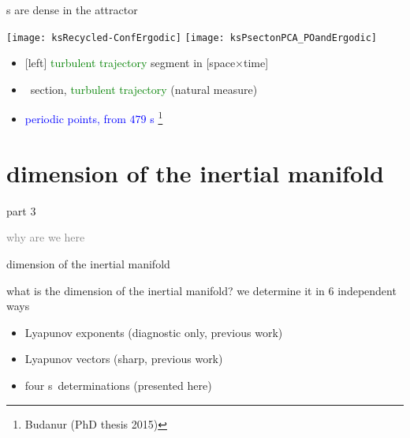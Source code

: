\begin{frame}{\po s are dense in the attractor}
\begin{center}
\texttt{[image: ksRecycled-ConfErgodic]}
\texttt{[image: ksPsectonPCA\_POandErgodic]}
\end{center}
\begin{itemize}
  \item {[left]} \textcolor{green}{turbulent trajectory} segment in [space$\times$time]
  \item \Poincare\ section, \textcolor{green}{turbulent trajectory} (natural measure)
  \item \textcolor{blue}{periodic points, from $479$ \po s}%
\footnote{\footnotesize
Budanur (PhD thesis 2015)}
\end{itemize}

\end{frame}

\section[dimension of the inertial manifold]
{dimension of the inertial manifold}

\begin{frame}{part 3}
\begin{enumerate}
              \item
    \textcolor{gray}{\small
why are we here
              \item
\statesp
    }
              \item
    {\Large
dimension of the inertial manifold
                    }
            \end{enumerate}
\end{frame}

\begin{frame}{what is the dimension of the inertial manifold?}
we determine it in 6 independent ways

\bigskip

\begin{itemize}
  \item Lyapunov exponents (diagnostic only, previous work)
  \item Lyapunov vectors (sharp, previous work)
  \item four \po s\ determinations (presented here)
\end{itemize}
\end{frame}


